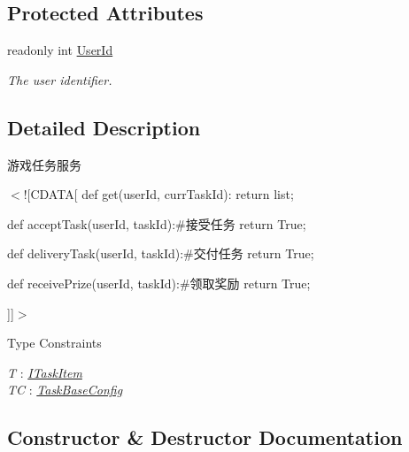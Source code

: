 \subsection*{Protected Attributes}
\begin{DoxyCompactItemize}
\item 
readonly int \mbox{\hyperlink{class_t_net_1_1_task_1_1_task_service_aca210228a695a1f110af99bcce5808aa}{User\+Id}}
\begin{DoxyCompactList}\small\item\em The user identifier. \end{DoxyCompactList}\end{DoxyCompactItemize}


\subsection{Detailed Description}
游戏任务服务 

$<$!\mbox{[}C\+D\+A\+TA\mbox{[} def get(user\+Id, curr\+Task\+Id)\+: return list;

def accept\+Task(user\+Id, task\+Id)\+:\#接受任务 return True;

def delivery\+Task(user\+Id, task\+Id)\+:\#交付任务 return True;

def receive\+Prize(user\+Id, task\+Id)\+:\#领取奖励 return True;

\mbox{]}\mbox{]}$>$ \begin{Desc}
\item[Type Constraints]\begin{description}
\item[{\em T} : {\em \mbox{\hyperlink{interface_t_net_1_1_task_1_1_i_task_item}{I\+Task\+Item}}}]\item[{\em TC} : {\em \mbox{\hyperlink{class_t_net_1_1_task_1_1_task_base_config}{Task\+Base\+Config}}}]\end{description}
\end{Desc}


\subsection{Constructor \& Destructor Documentation}
\mbox{\label{class_t_net_1_1_task_1_1_task_service_add7ae97d69dfa53e3450d9325ec89c53}} 
